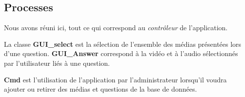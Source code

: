 \subsection{Processes}

Nous avons réuni ici, tout ce qui correspond au \textit{contrôleur} de l'application.

La classe \textbf{GUI\_select} est la sélection de l'ensemble des médias présentées lors d'une question.
\textbf{GUI\_Answer} correspond à la vidéo et à l'audio sélectionnés par l'utilisateur liés à une question.

\textbf{Cmd} est l'utilisation de l'application par l'administrateur lorsqu'il voudra ajouter ou retirer des médias et questions de la base de données.